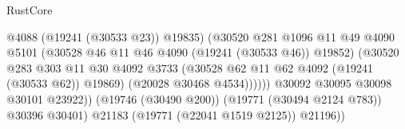 \begin{lexlean}{RustCore}
\begin{coremodule}
                                                    @4088
                                                    (@19241 (@30533 @23))
                                                    @19835)
                                                  (@30520
                                                    @281
                                                    @1096
                                                    @11
                                                    @49
                                                    @4090
                                                    @5101
                                                    (@30528
                                                      @46
                                                      @11
                                                      @46
                                                      @4090
                                                      (@19241 (@30533 @46))
                                                      @19852)
                                                    (@30520
                                                      @283
                                                      @303
                                                      @11
                                                      @30
                                                      @4092
                                                      @3733
                                                      (@30528
                                                        @62
                                                        @11
                                                        @62
                                                        @4092
                                                        (@19241 (@30533 @62))
                                                        @19869)
                                                      (@20028 @30468 @4534))))))
                                            @30092
                                            @30095
                                            @30098
                                            @30101
                                            @23922))
                                        (@19746 (@30490 @200))
                                        (@19771 (@30494 @2124 @783))
                                        @30396
                                        @30401)
                                      @21183
                                      (@19771 (@22041 @1519 @2125))
                                      @21196))

\end{coremodule}
\end{lexlean}
